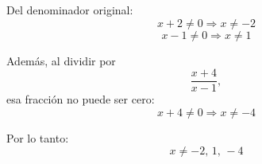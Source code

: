 \documentclass[11pt]{article}
\begin{document}
\begin{enumerate}
\begin{enumerate}[label=\alph*)]
		Del denominador original:
		\[
		x+2\neq 0 \Rightarrow x\neq -2
		\]
		\[
		x-1\neq 0 \Rightarrow x\neq 1
		\]
		
		Además, al dividir por
		\[
		\frac{x+4}{x-1},
		\]
		esa fracción no puede ser cero:
		\[
		x+4\neq 0 \Rightarrow x\neq -4
		\]
		
		Por lo tanto:
		\[
		\boxed{x\neq -2,\,1,\,-4}
		\]
		\end{enumerate}
	
	\vspace{0.4cm}
	

\end{enumerate}
\end{document}
